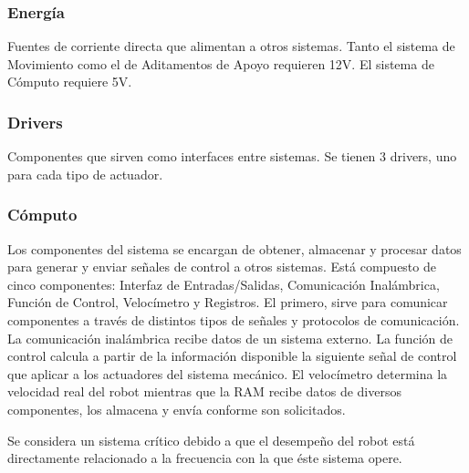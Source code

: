 \subsubsection{Energía}
Fuentes de corriente directa que alimentan a otros sistemas. Tanto el sistema de Movimiento como el de Aditamentos de Apoyo requieren 12V. El sistema de Cómputo requiere 5V.

\subsubsection{Drivers}
Componentes que sirven como interfaces entre sistemas. Se tienen 3 drivers, uno para cada tipo de actuador.

\subsubsection{Cómputo}
Los componentes del sistema se encargan de obtener, almacenar y procesar datos para generar y enviar señales de control a otros sistemas. Está compuesto de cinco componentes: Interfaz de Entradas/Salidas, Comunicación Inalámbrica, Función de Control, Velocímetro y Registros. El primero, sirve para comunicar componentes a través de distintos tipos de señales y protocolos de comunicación. La comunicación inalámbrica recibe datos de un sistema externo. La función de control calcula a partir de la información disponible la siguiente señal de control que aplicar a los actuadores del sistema mecánico. El velocímetro determina la velocidad real del robot mientras que la \gls{RAM} recibe datos de diversos componentes, los almacena y envía conforme son solicitados.

Se considera un sistema crítico debido a que el desempeño del robot está directamente relacionado a la frecuencia con la que éste sistema opere.






